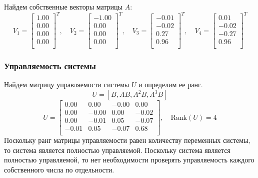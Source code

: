 Найдем собственные векторы матрицы $A$:
\begin{equation}
    V_1 = \begin{bmatrix}
    1.00  \\ 0.00  \\ 0.00 \\ 0.00 \\
    \end{bmatrix}^T,\quad
    V_2 = \begin{bmatrix}
    -1.00 \\ 0.00 \\ 0.00 \\ 0.00 \\
    \end{bmatrix}^T,\quad
    V_3 = \begin{bmatrix}
    -0.01 \\ -0.02 \\ 0.27 \\ 0.96 \\
    \end{bmatrix}^T,\quad
    V_4 = \begin{bmatrix}
    0.01  \\ -0.02  \\ -0.27 \\ 0.96 \\
    \end{bmatrix}^T
\end{equation}

\subsubsection{Управляемость системы}
Найдем матрицу управляемости системы $U$ и определим ее ранг. 
\begin{equation}
    U = [B, AB, A^2B, A^3B]
\end{equation}
\begin{equation}
    U = \begin{bmatrix}
    0.00  & 0.00  & -0.00  & 0.00 \\ 
    0.00  & -0.00  & 0.00  & -0.02 \\ 
    0.00  & -0.01  & 0.05  & -0.07 \\ 
    -0.01  & 0.05  & -0.07  & 0.68 \\ 
    \end{bmatrix}, \quad \text{Rank}(U) = 4
\end{equation}
Поскольку ранг матрицы управляемости равен количеству переменных системы, то система является полностью управляемой. 
Поскольку система является полностью управляемой, то нет необходимости проверять управляемость каждого собственного 
числа по отдельности. 

